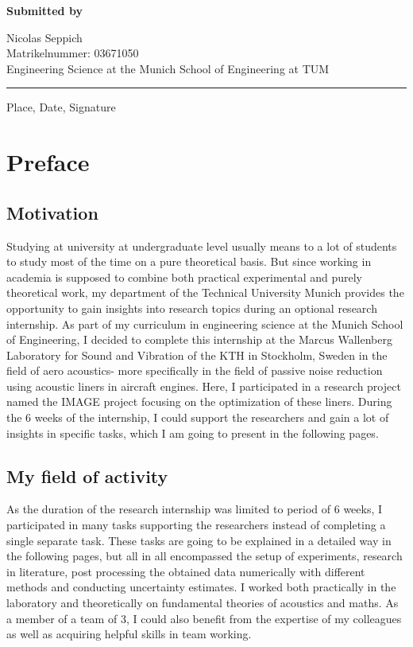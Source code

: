 \documentclass[11pt]{report} %
\newcommand{\EingereichtVon}{%
    Nicolas Seppich\\
    Matrikelnummer: 03671050\\
    Engineering Science at the Munich School of Engineering at TUM}
\newcommand{\Ort}{%
    Place}
\newcommand{\Datum}{%
    Date}
\begin{document}
\vspace*{6.3mm}
\textbf{Submitted by}\tab 
\begin{minipage}[t]{\textwidth-\CurrentLineWidth}
\EingereichtVon
\end{minipage}
\vspace*{-1mm}

\rule[-3.7mm]{\linewidth}{0.5pt}
\Ort{}, \Datum{}, Signature

\newpage
\tableofcontents
\newpage


\chapter{Preface}
\section{Motivation}
Studying at university at undergraduate level usually means to a lot of students to study most of the time on a pure theoretical basis.
But since working in academia is supposed to combine both practical experimental and purely theoretical work, my department of the Technical University Munich provides the opportunity to gain insights into research topics during an optional research internship.
As part of my curriculum in engineering science at the Munich School of Engineering, I decided to complete this internship at the Marcus Wallenberg Laboratory for Sound and Vibration of the KTH in Stockholm, Sweden in the field of aero acoustics-
more specifically in the field of passive noise reduction using acoustic liners in aircraft engines. Here, I participated in a research project named the IMAGE project focusing on the optimization of these liners. 
During the 6 weeks of the internship, I could support the researchers and gain a lot of insights in specific tasks, which I am going to present in the following pages. 

\section{My field of activity} 
As the duration of the research internship was limited to period of 6 weeks, I participated in many tasks supporting the researchers instead of completing a single separate task.
These tasks are going to be explained in a detailed way in the following pages, but all in all encompassed the setup of experiments, research in literature, post processing the obtained data numerically with different methods and conducting uncertainty estimates.
I worked both practically in the laboratory and theoretically on fundamental theories of acoustics and maths.
As a member of a team of 3, I could also benefit from the expertise of my colleagues as well as acquiring helpful skills in team working. 
\end{document}
